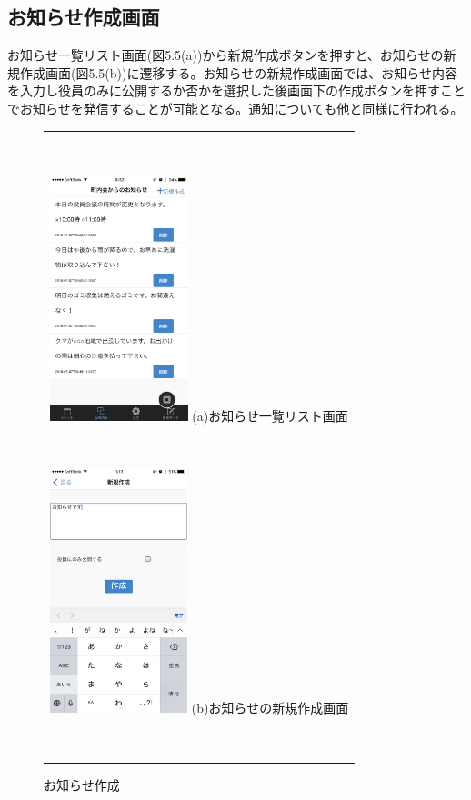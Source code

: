 \subsection{お知らせ作成画面}%
お知らせ一覧リスト画面(図5.5(a))から新規作成ボタンを押すと、お知らせの新規作成画面(図5.5(b))に遷移する。お知らせの新規作成画面では、お知らせ内容を入力し役員のみに公開するか否かを選択した後画面下の作成ボタンを押すことでお知らせを発信することが可能となる。通知についても他と同様に行われる。
​
\begin{figure}[htbp]
  \begin{center}
    \begin{tabular}{c}
​
      \begin{minipage}{0.33\hsize}
        \begin{center}
\includegraphics[width=4cm]{notification_list.PNG}
          \hspace{1cm} %
          {\footnotesize (a)お知らせ一覧リスト画面}
        \end{center}
      \end{minipage}
​
      \begin{minipage}{0.33\hsize}
        \begin{center}
\includegraphics[width=4cm]{notification_add.PNG}
          \hspace{1cm}%
          {\footnotesize (b)お知らせの新規作成画面}
        \end{center}
      \end{minipage}
​
    \end{tabular}
    \caption{お知らせ作成}
    \label{fig:lena}
  \end{center}
\end{figure}
​

